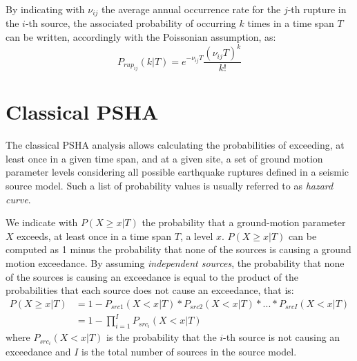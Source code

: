 By indicating with $\nu_{ij}$ the average annual occurrence rate for the $j$-th
rupture in the $i$-th source, the associated probability of occurring $k$ times
in a time span $T$ can be written, accordingly with the Poissonian assumption,
as:
\begin{equation}
\label{eq:poisson_pd}
P_{rup_{ij}}(k | T) = e^{-\nu_{ij} T} \frac{(\nu_{ij} T) ^ {k}}{k!}
\end{equation}

\section{Classical PSHA}
The classical PSHA analysis allows calculating the probabilities of exceeding,
at least once in a given time span, and at a given site, a set of ground motion
parameter levels considering all possible earthquake ruptures defined in a
seismic source model. Such a list of probability values is usually referred to
as \textit{hazard curve}.

We indicate with $P(X \ge x | T)$ the probability that a ground-motion parameter
$X$ exceeds, at least once in a time span $T$, a level $x$. $P(X \ge x | T)$ can
be computed as 1 minus the probability that none of the sources is causing a
ground motion exceedance. By assuming \textit{independent sources}, the
probability that none of the sources is causing an exceedance is equal to the
product of the probabilities that each source does not cause an exceedance, that
is:
\begin{align}
\label{eq:hazard_eq}
P(X \ge x | T) & =  1 - P_{src1}(X < x | T) * P_{src2}(X < x | T) * ... * P_{srcI}(X < x | T) \nonumber \\
		      & =  1 - \prod_{i=1}^{I} P_{src_{i}}(X < x | T)
\end{align}
where $P_{src_{i}}(X < x | T)$ is the probability that the $i$-th source is not
causing an exceedance and $I$ is the total number of sources in the source
model.

